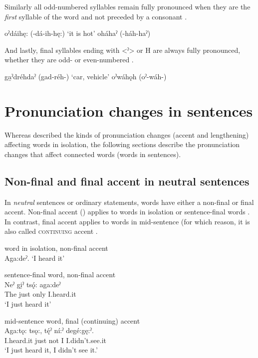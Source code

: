 Similarly all odd-numbered syllables remain fully pronounced when they are the \emph{first} syllable of the word and not preceded by a consonant .

\ea\label{ex:lmex9} 
\ea oˀdáihę: (-dá-ih-hę:) ‘it is hot’\label{ex:lmex9a}
\ex oháhaˀ (-háh-haˀ) 
\z
\z 

And lastly, final syllables ending with <ˀ> or H are always fully pronounced, whether they are odd- or even-numbered . 


\ea\label{ex:lmex10} 
\ea ga̱ˀdréhdaˀ (gad-réh-) ‘car, vehicle’
\ex oˀwáhǫh (oˀ-wáh-) 
\z
\z

\section{Pronunciation changes in sentences} \label{ch:Pronunciation changes in sentences}

Whereas  described the kinds of pronunciation changes (accent and lengthening) affecting words in isolation, the following sections describe the pronunciation changes that affect connected words (words in sentences). 

\subsection{Non-final and final accent in neutral sentences} \label{Non-final and final accent in neutral sentences}
In \emph{neutral} sentences or ordinary statements, words have either a non-final or final accent. Non-final accent () applies to words in isolation  or sentence-final words . In contrast, final accent applies to words in mid-sentence (for which reason, it is also called \textsc{continuing} accent .

\ea\label{ex:finalacex100} word in isolation, non-final accent\\
Aga:deˀ. ‘I heard it’
\z


\ea\label{ex:finalacex2} sentence-final word, non-final accent\\
\gll Neˀ  gi̱ˀ  tsǫ́:  aga:deˀ \\
The just only  I.heard.it\\
\glt ‘I just heard it’ 
\z


\ea\label{ex:finalacex3} mid-sentence word, final (continuing) accent\\
\gll Aga:tǫ: tsǫ:, tę́ˀ ní:ˀ degé:gę:ˀ. \\
I.heard.it just not I I.didn’t.see.it\\
\glt ‘I just heard it, I didn’t see it.’ 
\z


